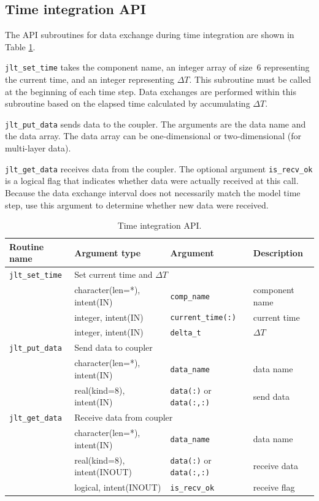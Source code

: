 \documentclass[11pt,a4paper]{report}
\newcommand{\tabref}[1]{Table \ref{#1}}
\begin{document}
\subsection{Time integration API}

The API subroutines for data exchange
during time integration
are shown in \tabref{table:jlt_api_integration}.

\texttt{jlt\_set\_time} takes the component name,
an integer array of size~6
representing the current time,
and an integer representing $\Delta T$.
This subroutine must be called
at the beginning of each time step.
Data exchanges are performed within this subroutine
based on the elapsed time
calculated by accumulating $\Delta T$.

\texttt{jlt\_put\_data} sends data to the coupler.
The arguments are the data name
and the data array.
The data array can be one-dimensional
or two-dimensional (for multi-layer data).

\texttt{jlt\_get\_data} receives data from the coupler.
The optional argument \texttt{is\_recv\_ok}
is a logical flag that indicates
whether data were actually received at this call.
Because the data exchange interval
does not necessarily match the model time step,
use this argument to determine
whether new data were received.

\begin{table}[H]
\begin{center}
\caption{Time integration API.}
{\small
\label{table:jlt_api_integration}
\begin{tabular}{llll}
\hline\hline
Routine name & Argument type & Argument & Description \\
\hline
 \texttt{jlt\_set\_time} &  \multicolumn{3}{l}{Set current time and $\Delta T$}\\
           &  character(len=*), intent(IN) &  \texttt{comp\_name} & component name\\
           &  integer, intent(IN) &  \texttt{current\_time(:)} & current time\\
           &  integer, intent(IN) &  \texttt{delta\_t} & $\Delta T$\\
\hline
 \texttt{jlt\_put\_data} & \multicolumn{3}{l}{Send data to coupler} \\
                & character(len=*), intent(IN) & \texttt{data\_name} & data name\\
                & real(kind=8), intent(IN) & \texttt{data(:)} or \texttt{data(:,:)} & send data\\
\hline
 \texttt{jlt\_get\_data} & \multicolumn{3}{l}{Receive data from coupler} \\
                & character(len=*), intent(IN) & \texttt{data\_name} & data name\\
                & real(kind=8), intent(INOUT) & \texttt{data(:)} or \texttt{data(:,:)} & receive data\\
                & logical, intent(INOUT) & \texttt{is\_recv\_ok} & receive flag\\
\hline\hline
\end{tabular}
}
\end{center}
\end{table}
\end{document}
